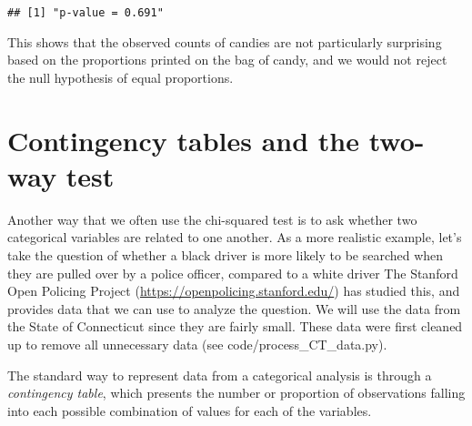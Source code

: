 \documentclass[]{book}
\newenvironment{Shaded}{\begin{snugshade}}{\end{snugshade}}
\newcommand{\KeywordTok}[1]{\textcolor[rgb]{0.13,0.29,0.53}{\textbf{#1}}}
\newcommand{\DataTypeTok}[1]{\textcolor[rgb]{0.13,0.29,0.53}{#1}}
\newcommand{\StringTok}[1]{\textcolor[rgb]{0.31,0.60,0.02}{#1}}
\newcommand{\CommentTok}[1]{\textcolor[rgb]{0.56,0.35,0.01}{\textit{#1}}}
\newcommand{\OtherTok}[1]{\textcolor[rgb]{0.56,0.35,0.01}{#1}}
\newcommand{\OperatorTok}[1]{\textcolor[rgb]{0.81,0.36,0.00}{\textbf{#1}}}
\newcommand{\NormalTok}[1]{#1}
\theoremstyle{definition}
\theoremstyle{definition}
\theoremstyle{definition}
\theoremstyle{remark}
\begin{document}
\begin{verbatim}
## [1] "p-value = 0.691"
\end{verbatim}

This shows that the observed counts of candies are not particularly
surprising based on the proportions printed on the bag of candy, and we
would not reject the null hypothesis of equal proportions.

\section{Contingency tables and the two-way
test}\label{contingency-tables-and-the-two-way-test}

Another way that we often use the chi-squared test is to ask whether two
categorical variables are related to one another. As a more realistic
example, let's take the question of whether a black driver is more
likely to be searched when they are pulled over by a police officer,
compared to a white driver The Stanford Open Policing Project
(\url{https://openpolicing.stanford.edu/}) has studied this, and
provides data that we can use to analyze the question. We will use the
data from the State of Connecticut since they are fairly small. These
data were first cleaned up to remove all unnecessary data (see
code/process\_CT\_data.py).

\begin{Shaded}
\end{Shaded}

The standard way to represent data from a categorical analysis is
through a \emph{contingency table}, which presents the number or
proportion of observations falling into each possible combination of
values for each of the variables.
\end{document}
